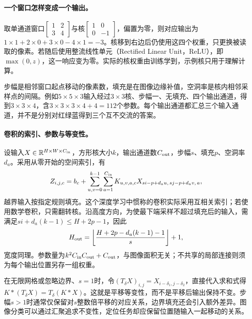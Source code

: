\paragraph{一个窗口怎样变成一个输出。}
取单通道窗口$\left[\begin{smallmatrix}1&2\\3&4\end{smallmatrix}\right]$与核$\left[\begin{smallmatrix}1&0\\0&-1\end{smallmatrix}\right]$，偏置为零，则对应输出为$1\times1+2\times0+3\times0-4\times1=-3$。核移到右边后仍使用这四个权重，只更换被读取的像素。若随后使用整流线性单元（Rectified Linear Unit，ReLU），即$\max(0,z)$，这一响应变为零。实际的核权重由训练学到，示例核只用于理解计算。

步幅是相邻窗口起点移动的像素数，填充是在图像边缘补值，空洞率是核内相邻采样点的间隔。例如$5\times5\times3$输入经过$3\times3$核、步幅一、无填充、四个输出通道，得到$3\times3\times4$，含$3\times3\times3\times4+4=112$个参数。每个输出通道都汇总三个输入通道，并不是分别对红绿蓝得到三个互不交流的答案。

\paragraph{卷积的索引、参数与等变性。}
设输入$X\in\mathbb{R}^{H\times W\times C_{\rm in}}$，方形核大小$k$，输出通道数$C_{\rm out}$，步幅$s$、填充$p$、空洞率$d_a$。采用从零开始的空间索引，有
\begin{equation}
 Z_{i,j,c}=b_c+\sum_{u,v=0}^{k-1}\sum_{a=1}^{C_{\rm in}}
 K_{u,v,a,c}X_{si-p+d_au,\,sj-p+d_av,\,a},
\end{equation}
越界输入按指定规则填充。这个深度学习中惯称的卷积实际采用互相关索引；若使用数学卷积，只需翻转核。沿高度方向，为使最下端采样不超过填充后的输入，需满足$s i+d_a(k-1)\leq H+2p-1$，因此
\begin{equation}
 H_{\rm out}=\left\lfloor\frac{H+2p-d_a(k-1)-1}{s}\right\rfloor+1,
\end{equation}
宽度同理。参数量为$k^2C_{\rm in}C_{\rm out}+C_{\rm out}$，与图像面积无关；不共享的局部连接则须为每个输出位置另存一组权重。

在无限网格或忽略边界、$s=1$时，令$(T_\delta X)_{i,j}=X_{i-\delta_1,j-\delta_2}$，直接代入求和式得$K*(T_\delta X)=T_\delta(K*X)$。这就是平移等变性，而不是平移后输出保持不变。步幅$s>1$时通常仅保留对$s$整数倍平移的对应关系，边界填充还会引入额外差异。图像分类可以通过汇聚追求不变性，定位任务却应保留位置随输入一起移动的关系。

